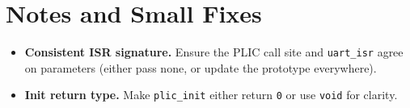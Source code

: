 \section*{Notes and Small Fixes}

\begin{itemize}
  \item \textbf{Consistent ISR signature.} Ensure the PLIC call site and \texttt{uart\_isr} agree
        on parameters (either pass none, or update the prototype everywhere).
  \item \textbf{Init return type.} Make \texttt{plic\_init} either return \texttt{0} or use
        \texttt{void} for clarity.
\end{itemize}
